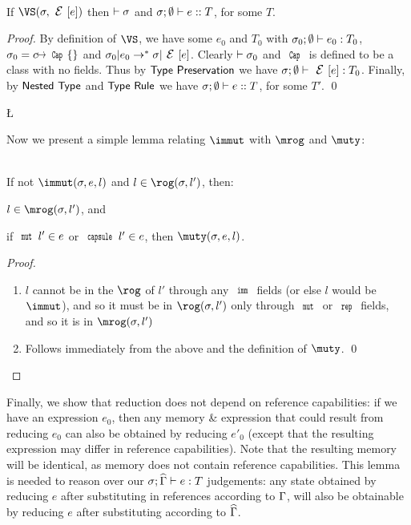 \SS\begin{Corollary}\ \\
	\indent If $\VS(\s,\E[e])$ then $\vdash\sigma$ and $\tyer eT$, for some $T$.
\end{Corollary}
\SS\begin{proof}
	By definition of $\VS$, we have some $e_0$ and $T_0$ with $\tyr[\s_0]{e_0}T_0$,
	$\s_0 = c\mapsto\Kw{Cap}\{\}$ and $\s_0|e_0\rightarrow^*\s|\E[e]$. Clearly
	$\vdash\sigma_0$ and $\Kw{Cap}$ is defined to be a class with no fields.
	Thus by $\textsf{Type Preservation}$ we have $\tyr {\E[e]}{T_0}$.
	Finally, by $\textsf{Nested Type}$ and $\textsf{Type Rule}$ we have
	$\tyer eT$, for some
	$T'$.
\qed\end{proof}

\L

Now we present a simple lemma relating $\immut$ with $\mrog$ and $\muty$:

\SS\begin{Lemma}\ \\
	\indent If not $\immut(\s,e,l)$ and $l\in\rog(\s,l')$, then:
	\begin{ienumerate}
		\item $l\in\mrog(\s,l')$, and
		\item if $\Kw{mut}\,l'\in e$ or $\Kw{capsule}\,l'\in e$, then $\muty(\s,e,l)$.
	\end{ienumerate}
\end{Lemma}
\SS\begin{proof}
	\SS\begin{enumerate}
		\item $l$ cannot be in the $\rog$ of $l'$ through any $\Kw{imm}$ fields (or else $l$ would be $\immut$), and so it must be in $\rog(\s,l')$ only through $\Kw{mut}$ or $\Kw{rep}$ fields, and so it is in $\mrog(\s,l')$
		\item Follows immediately from the above and the definition of $\muty$.
	\qed\end{enumerate}
\end{proof}

Finally, we show that reduction does not depend on reference capabilities:
if we have an expression $e_0$, then any memory \& expression that could result from reducing $e_0$ 
can also be obtained by reducing $e'_0$ (except that the resulting expression may differ in reference capabilities).
Note that the resulting memory will be identical, as memory does not contain reference capabilities.
This lemma is needed to reason over our $\ty[\s][\demut{\G}]{e}{T}$ judgements: any state obtained by reducing $e$ after substituting in references according to $\Gamma$, will also be obtainable by reducing $e$ after substituting according to $\widehat{\Gamma}$.

